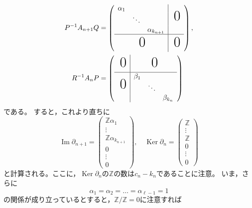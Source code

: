 \documentclass[uplatex]{jsarticle}
\DeclareMathOperator{\Image}{Im}
\DeclareMathOperator{\Kernel}{Ker}
\begin{document}
\begin{align}
  P^{-1} A_{n+1} Q &=
    \left( \begin{array}{ccc|c}
      \alpha_{1} &        &                  & \multirow{3}{*}{\BigZero} \\
                 & \ddots &                  & \\
                 &        & \alpha_{k_{n+1}} & \\ \hline
      \multicolumn{3}{c|}{\BigZero} & \BigZero
    \end{array} \right), \\
    R^{-1} A_{n} P &=
    \left( \begin{array}{c|ccc}
      \BigZero                  & \multicolumn{3}{c}{\BigZero} \\ \hline
      \multirow{3}{*}{\BigZero} & \beta_{1} &        & \\
                                &           & \ddots & \\
                                &           &        & \beta_{k_{n}} \\
    \end{array} \right)
\end{align}
である。
すると，これより直ちに
\begin{equation}
  \Image \partial_{n+1} = \begin{pmatrix}
    \mathbb{Z} \alpha_{1} \\ \vdots \\ \mathbb{Z} \alpha_{k_{n+1}} \\ 0 \\ \vdots \\ 0
  \end{pmatrix}, \quad 
  \Kernel \partial_{n} = \begin{pmatrix}
    \mathbb{Z} \\ \vdots \\ \mathbb{Z} \\ 0 \\ \vdots \\ 0
  \end{pmatrix}
\end{equation}
と計算される。ここに，$\Kernel \partial_{n}$の$\mathbb{Z}$の数は$c_{n} - k_{n}$であることに注意。
いま，さらに
\begin{equation}
  \alpha_{1} = \alpha_{2} = \dots = \alpha_{\ell-1} = 1
\end{equation}
の関係が成り立っているとすると，$\mathbb{Z} / \mathbb{Z} = 0$に注意すれば
\end{document}
